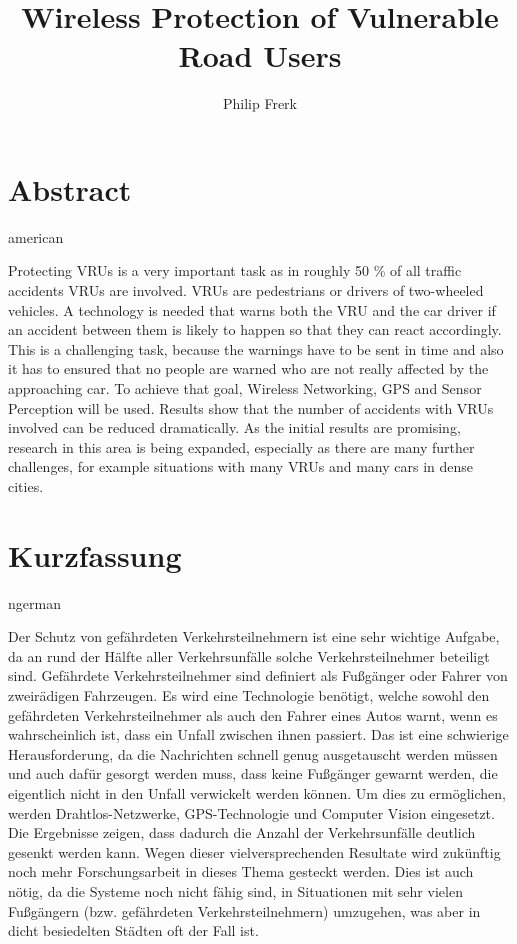 \documentclass[]{ccs-thesis}
\author{Philip Frerk}
\title{Wireless Protection of Vulnerable Road Users}
\begin{document}

\maketitle

\chapter*{Abstract}
\begin{otherlanguage*}{american}

Protecting \acp{VRU} is a very important task as in roughly 50 \% of all traffic accidents \acp{VRU} are involved. \acp{VRU} are pedestrians or drivers of two-wheeled vehicles.
A technology is needed that warns both the \ac{VRU} and the car driver if an accident between them is likely to happen so that they can react accordingly.  This is a challenging task, because the warnings have to be sent in time  and also it has to ensured that no people are warned who are not really affected by the approaching car.
To achieve that goal, Wireless Networking, GPS and Sensor Perception will be used.
Results show that the number of accidents with \acp{VRU} involved can be reduced dramatically.
As the initial results are promising, research in this area is being expanded, especially as there are many further challenges, for example situations with many \acp{VRU} and many cars in dense cities.


\end{otherlanguage*}


\chapter*{Kurzfassung}
\begin{otherlanguage*}{ngerman}

Der Schutz von gefährdeten Verkehrsteilnehmern ist eine sehr wichtige Aufgabe, da an rund der Hälfte aller Verkehrsunfälle solche Verkehrsteilnehmer beteiligt sind. Gefährdete Verkehrsteilnehmer sind definiert als Fußgänger oder Fahrer von zweirädigen Fahrzeugen. Es wird eine Technologie benötigt, welche sowohl den gefährdeten Verkehrsteilnehmer als auch den Fahrer eines Autos warnt, wenn es wahrscheinlich ist, dass ein Unfall zwischen ihnen passiert. Das ist eine schwierige Herausforderung, da die Nachrichten schnell genug ausgetauscht werden müssen und auch dafür gesorgt werden muss, dass keine Fußgänger gewarnt werden, die eigentlich nicht in den Unfall verwickelt werden können. Um dies zu ermöglichen, werden Drahtlos-Netzwerke, GPS-Technologie und Computer Vision eingesetzt. Die Ergebnisse zeigen, dass dadurch die Anzahl der Verkehrsunfälle deutlich gesenkt werden kann. Wegen dieser vielversprechenden Resultate wird zukünftig noch mehr Forschungsarbeit in dieses Thema gesteckt werden. Dies ist auch nötig, da die Systeme noch nicht fähig sind, in Situationen mit sehr vielen Fußgängern (bzw. gefährdeten Verkehrsteilnehmern) umzugehen, was aber in dicht besiedelten Städten oft der Fall ist.


\end{otherlanguage*}
\acresetall
\end{document}
